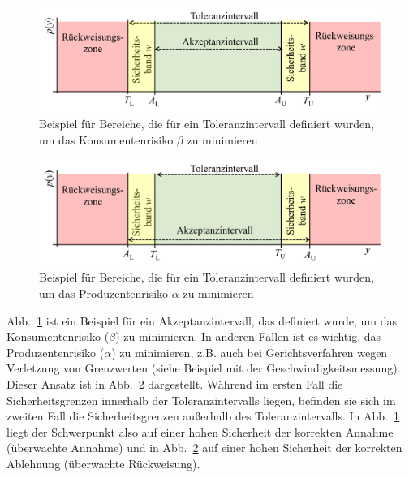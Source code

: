 \begin{figure}[!htb]
	\begin{center}
	\includegraphics[width=140mm]{06_vorlesung/media/Toleranzband_KonsumerRisiko.png}
	\caption{Beispiel für Bereiche, die für ein Toleranzintervall definiert wurden, um das Konsumentenrisiko $\beta$ zu minimieren}
		\label{fig:Toleranz_Konsumentenrisiko}
		\end{center}
\end{figure}
\begin{figure}[!htb]
	\begin{center}
		\includegraphics[width=140mm]{06_vorlesung/media/Toleranzband_ProduzentenRisiko.png}
	\caption{Beispiel für Bereiche, die für ein Toleranzintervall definiert wurden, um das Produzentenrisiko $\alpha$ zu minimieren}
		\label{fig:Toleranz_Produzentenrisiko}
		\end{center}
\end{figure}
Abb.~\ref{fig:Toleranz_Konsumentenrisiko} ist ein Beispiel für ein Akzeptanzintervall, das definiert wurde, um das Konsumentenrisiko ($\beta$) zu minimieren. In anderen Fällen ist es wichtig, das Produzentenrisiko ($\alpha$) zu minimieren, z.B. auch bei Gerichtsverfahren wegen Verletzung von Grenzwerten (siehe Beispiel mit der Geschwindigkeitsmessung). Dieser Ansatz ist in Abb.~\ref{fig:Toleranz_Produzentenrisiko} dargestellt. Während im ersten Fall die Sicherheitsgrenzen innerhalb der Toleranzintervalls liegen, befinden sie sich im zweiten Fall die Sicherheitsgrenzen außerhalb des Toleranzintervalls. In Abb.~\ref{fig:Toleranz_Konsumentenrisiko} liegt der Schwerpunkt also auf einer hohen Sicherheit der korrekten Annahme (überwachte Annahme) und in Abb.~\ref{fig:Toleranz_Produzentenrisiko} auf einer hohen Sicherheit der korrekten Ablehnung (überwachte Rückweisung).

